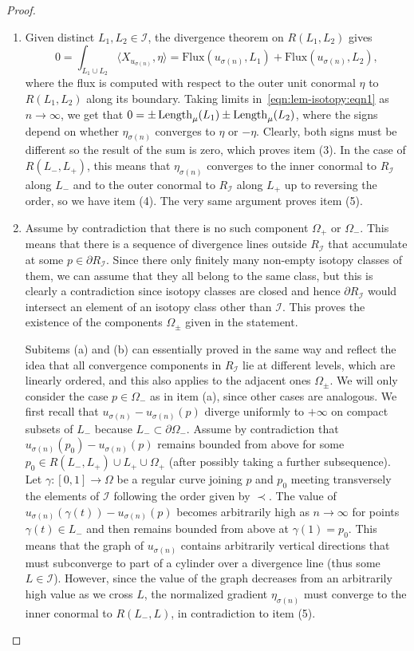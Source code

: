 \documentclass[a4paper,10pt,reqno]{amsart}
\newcommand{\Length}{\mathop{\rm Length}\nolimits}
\newcommand{\Flux}{\mathrm{Flux}}
\theoremstyle{definition}
\theoremstyle{remark}
\numberwithin{equation}{section}
\begin{document}
\begin{proof}
\begin{enumerate}[label=(\arabic*)]
	\item[(3)--(5)] Given distinct $L_1,L_2\in\mathcal I$, the divergence theorem on $R(L_1,L_2)$ gives
	\begin{equation}\label{eqn:lem-isotopy:eqn1}
	0=\int_{L_1\cup L_2}\langle X_{u_{\sigma(n)}},\eta\rangle=\Flux(u_{\sigma(n)},L_1)+\Flux(u_{\sigma(n)},L_2),
	\end{equation}
	where the flux is computed with respect to the outer unit conormal $\eta$ to $R(L_1,L_2)$ along its boundary. Taking limits in~\eqref{eqn:lem-isotopy:eqn1} as $n\to\infty$, we get that $0=\pm\Length_\mu(L_1)\pm\Length_\mu(L_2)$, where the signs depend on whether $\eta_{\sigma(n)}$ converges to $\eta$ or $-\eta$. Clearly, both signs must be different so the result of the sum is zero, which proves item (3). In the case of $R(L_-,L_+)$, this means that $\eta_{\sigma(n)}$ converges to the inner conormal to $R_{\mathcal I}$ along $L_-$ and to the outer conormal to $R_{\mathcal I}$ along $L_+$ up to reversing the order, so we have item (4). The very same argument proves item (5).
	\item[(6)] Assume by contradiction that there is no such component $\Omega_+$ or $\Omega_-$. This means that there is a sequence of divergence lines outside $R_{\mathcal I}$ that accumulate at some $p\in\partial R_{\mathcal I}$. Since there only finitely many non-empty isotopy classes of them, we can assume that they all belong to the same class, but this is clearly a contradiction since isotopy classes are closed and hence $\partial R_{\mathcal I}$ would intersect an element of an isotopy class other than $\mathcal I$. This proves the existence of the components $\Omega_\pm$ given in the statement.

	Subitems (a) and (b) can essentially proved in the same way and reflect the idea that all convergence components in $R_{\mathcal I}$ lie at different levels, which are linearly ordered, and this also applies to the adjacent ones $\Omega_\pm$. We will only consider the case $p\in\Omega_-$ as in item (a), since other cases are analogous. We first recall that $u_{\sigma(n)}-u_{\sigma(n)}(p)$ diverge uniformly to $+\infty$ on compact subsets of $L_-$ because $L_-\subset\partial\Omega_-$. Assume by contradiction that $u_{\sigma(n)}(p_0)-u_{\sigma(n)}(p)$ remains bounded from above for some $p_0\in R(L_-,L_+)\cup L_+\cup\Omega_+$ (after possibly taking a further subsequence). Let $\gamma:[0,1]\to\Omega$ be a regular curve joining $p$ and $p_0$ meeting transversely the elements of $\mathcal I$ following the order given by $\prec$. The value of $u_{\sigma(n)}(\gamma(t))-u_{\sigma(n)}(p)$ becomes arbitrarily high as $n\to\infty$ for points $\gamma(t)\in L_-$ and then remains bounded from above at $\gamma(1)=p_0$. This means that the graph of $u_{\sigma(n)}$ contains arbitrarily vertical directions that must subconverge to part of a cylinder over a divergence line (thus some $L\in\mathcal I$). However, since the value of the graph decreases from an arbitrarily high value as we cross $L$, the normalized gradient $\eta_{\sigma(n)}$ must converge to the inner conormal to $R(L_-,L)$, in contradiction to item (5).\qedhere
\end{enumerate}
\end{proof}
\end{document}
